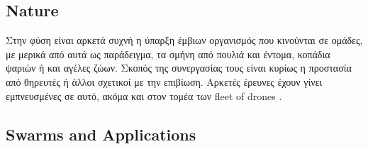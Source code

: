 \subsection{Nature} \label{sec:Chapter1-2-1}
Στην φύση είναι αρκετά συχνή η ύπαρξη έμβιων οργανισμός που κινούνται σε ομάδες, με μερικά από αυτά ως παράδειγμα, τα σμήνη από πουλιά και
έντομα, κοπάδια ψαριών ή και αγέλες ζώων. Σκοπός της συνεργασίας τους είναι κυρίως η προστασία από θηρευτές ή άλλοι σχετικοί με την επιβίωση.
Αρκετές έρευνες έχουν γίνει εμπνευ\-σμένες σε αυτό, ακόμα και στον τομέα των fleet of drones
\cite{research-on-drone-swarms-move-like-animals} \cite{research-on-drone-swarms-move-like-animals-like-documentary} \cite{swarm-of-drones}.
  
\subsection{Swarms and Applications} \label{sec:Chapter1-2-2}
